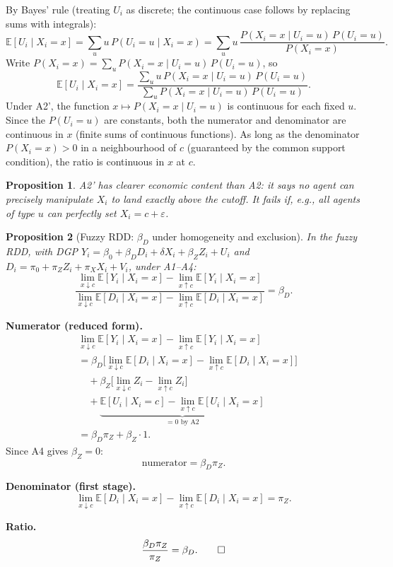 \documentclass[12pt,a4paper]{article}
\theoremstyle{plain}
\newtheorem{propositio}{Proposition}[section]
\theoremstyle{definition}
\renewenvironment{proof}{\pushQED{\qed}\normalfont}{\popQED\par\nobreak}
\newcommand{\E}{\mathbb{E}}
\begin{document}
\begin{proof}
By Bayes' rule (treating $U_i$ as discrete; the continuous case follows by replacing sums with integrals):
\[
  \E[U_i\mid X_i=x]
  = \sum_u u\,P(U_i=u\mid X_i=x)
  = \sum_u u\,\frac{P(X_i=x\mid U_i=u)\,P(U_i=u)}{P(X_i=x)}.
\]
Write $P(X_i=x)=\sum_u P(X_i=x\mid U_i=u)\,P(U_i=u)$, so
\[
  \E[U_i\mid X_i=x]
  = \frac{\sum_u u\, P(X_i=x\mid U_i=u)\,P(U_i=u)}
         {\sum_u P(X_i=x\mid U_i=u)\,P(U_i=u)}.
\]
Under A2', the function $x\mapsto P(X_i=x\mid U_i=u)$ is continuous for each fixed $u$.  Since the $P(U_i=u)$ are constants, both the numerator and denominator are continuous in $x$ (finite sums of continuous functions).  As long as the denominator $P(X_i=x)>0$ in a neighbourhood of $c$ (guaranteed by the common support condition), the ratio is continuous in $x$ at $c$.
\end{proof}

\begin{propositio}
  A2' has clearer economic content than A2: it says no agent can precisely manipulate $X_i$ to land exactly above the cutoff.  It fails if, e.g., all agents of type $u$ can perfectly set $X_i=c+\varepsilon$.
\end{propositio}

\begin{propositio}[Fuzzy RDD: $\beta_D$ under homogeneity and exclusion\label{prop:frdd_homog}]
In the fuzzy RDD, with DGP $Y_i=\beta_0+\beta_D D_i+\delta X_i+\beta_Z Z_i+U_i$ and $D_i=\pi_0+\pi_Z Z_i+\pi_X X_i+V_i$, under A1--A4:
\[
  \frac{\lim_{x\downarrow c}\E[Y_i\mid X_i=x]-\lim_{x\uparrow c}\E[Y_i\mid X_i=x]}
       {\lim_{x\downarrow c}\E[D_i\mid X_i=x]-\lim_{x\uparrow c}\E[D_i\mid X_i=x]}
  = \beta_D.
\]
\end{propositio}

\begin{proof}
\textbf{Numerator (reduced form).}
\begin{align*}
  &\lim_{x\downarrow c}\E[Y_i\mid X_i=x]-\lim_{x\uparrow c}\E[Y_i\mid X_i=x]\\
  &= \beta_D\bigl[\lim_{x\downarrow c}\E[D_i\mid X_i=x]-\lim_{x\uparrow c}\E[D_i\mid X_i=x]\bigr]\\
  &\quad + \beta_Z\bigl[\lim_{x\downarrow c}Z_i-\lim_{x\uparrow c}Z_i\bigr]\\
  &\quad + \underbrace{\E[U_i\mid X_i=c]-\lim_{x\uparrow c}\E[U_i\mid X_i=x]}_{\text{$=0$ by A2}}\\
  &= \beta_D\pi_Z + \beta_Z\cdot 1.
\end{align*}
Since A4 gives $\beta_Z=0$:
\[
  \text{numerator} = \beta_D\pi_Z.
\]

\textbf{Denominator (first stage).}
\[
  \lim_{x\downarrow c}\E[D_i\mid X_i=x]-\lim_{x\uparrow c}\E[D_i\mid X_i=x]
  = \pi_Z.
\]

\textbf{Ratio.}
\[
  \frac{\beta_D\pi_Z}{\pi_Z} = \beta_D. \qedhere
\]
\end{proof}
\end{document}
